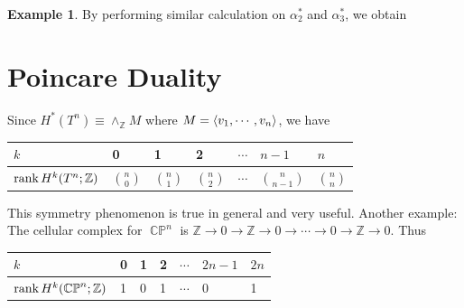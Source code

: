 \documentclass[psamsfonts]{amsart}
\theoremstyle{definition}
\newtheorem{exmp}[thm]{Example}
\theoremstyle{rem}
\DeclareMathOperator{\CP}{\mathbb{C}\mathbb{P}}
\numberwithin{equation}{section}
\begin{document}
\begin{exmp}
  By performing similar calculation on $\alpha_2^{\ast}$ and $\alpha_3^{\ast}$, we obtain
  \begin{center}
  \end{center}
\end{exmp}

\section{Poincare Duality}

Since $H^{\ast}(T^n) \equiv \wedge_{\mathbb{Z}} M$ where $M = \ev{ v_1, \cdots, v_n }$, we have

\begin{center}
  \begin{tabular}{| l | l | l | l | l | l | l |} \hline
    $k$                          & 0 & 1 & 2 & $\cdots$ & $n - 1$  & $n$ \\ \hline
    $\rank H^k(T^n; \mathbb{Z})$ & $\binom{n}{0}$ & $\binom{n}{1}$ & $\binom{n}{2}$ & $\cdots$ & $\binom{n}{n - 1}$ & $\binom{n}{n}$ \\ \hline
  \end{tabular}
\end{center}

This symmetry phenomenon is true in general and very useful.
Another example: The cellular complex for $\CP^n$ is $\mathbb{Z} \rightarrow 0 \rightarrow \mathbb{Z} \rightarrow 0 \rightarrow \cdots \rightarrow 0 \rightarrow \mathbb{Z} \rightarrow 0$.
Thus

\begin{center}
  \begin{tabular}{| l | l | l | l | l | l | l |} \hline
    $k$                          & 0 & 1 & 2 & $\cdots$ & $2n - 1$  & $2n$ \\ \hline
    $\rank H^k(\CP^n; \mathbb{Z})$ & 1 & 0 & 1 & $\cdots$ & 0         & 1 \\
    \hline
  \end{tabular}
\end{center}
\end{document}

